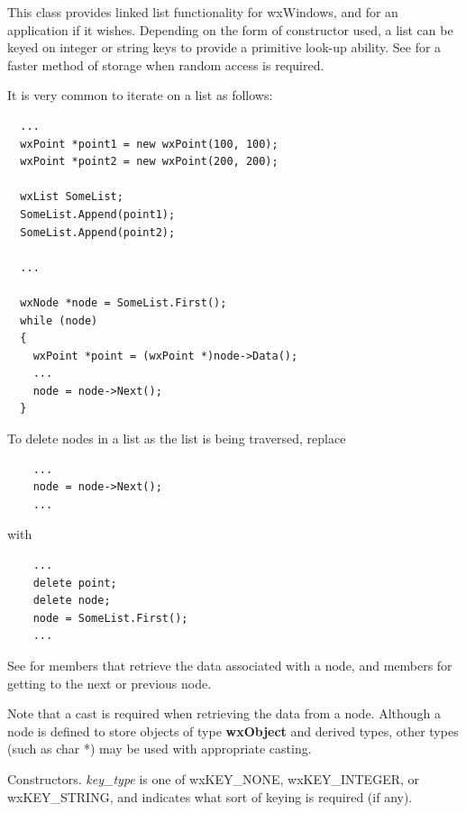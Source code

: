 This class provides linked list functionality for wxWindows, and for an application
if it wishes.  Depending on the form of constructor used, a list can be keyed on
integer or string keys to provide a primitive look-up ability. See \rtfsp
for a faster method of storage when random access is required.

It is very common to iterate on a list as follows:

\begin{verbatim}
  ...
  wxPoint *point1 = new wxPoint(100, 100);
  wxPoint *point2 = new wxPoint(200, 200);

  wxList SomeList;
  SomeList.Append(point1);
  SomeList.Append(point2);

  ...

  wxNode *node = SomeList.First();
  while (node)
  {
    wxPoint *point = (wxPoint *)node->Data();
    ...
    node = node->Next();
  }
\end{verbatim}

To delete nodes in a list as the list is being traversed, replace

\begin{verbatim}
    ...
    node = node->Next();
    ...
\end{verbatim}

with

\begin{verbatim}
    ...
    delete point;
    delete node;
    node = SomeList.First();
    ...
\end{verbatim}

See  for members that retrieve the data associated with a node, and
members for getting to the next or previous node.

Note that a cast is required when retrieving the data from a node.  Although a
node is defined to store objects of type {\bf wxObject} and derived types, other
types (such as char *) may be used with appropriate casting.






Constructors. {\it key\_type} is one of wxKEY\_NONE, wxKEY\_INTEGER, or wxKEY\_STRING,
and indicates what sort of keying is required (if any).

